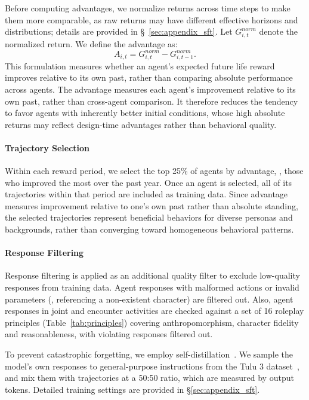 Before computing advantages, we normalize returns across time steps to make them more comparable, as raw returns may have different effective horizons and distributions; details are provided in \S~\ref{sec:appendix_sft}. Let \(G^{norm}_{i,t}\) denote the normalized return. We define the advantage as:
\[
A_{i,t} = G^{norm}_{i,t} - G^{norm}_{i,t-1}.
\]
This formulation measures whether an agent's expected future life reward improves relative to its own past, rather than comparing absolute performance across agents.
The advantage measures each agent's improvement relative to its own past, rather than cross-agent comparison.
It therefore reduces the tendency to favor agents with inherently better initial conditions, whose high absolute returns may reflect design-time advantages rather than behavioral quality.


\paragraph{Trajectory Selection}
Within each reward period, we select the top 25\% of agents by advantage, \ie, those who improved the most over the past year.
Once an agent is selected, all of its trajectories within that period are included as training data.
Since advantage measures improvement relative to one's own past rather than absolute standing, the selected trajectories represent beneficial behaviors for diverse personas and backgrounds, rather than converging toward homogeneous behavioral patterns.

\paragraph{Response Filtering}
Response filtering is applied as an additional quality filter to exclude low-quality responses from training data.
Agent responses with malformed actions or invalid parameters (\eg, referencing a non-existent character) are filtered out.
Also, agent responses in joint and encounter activities are checked against a set of 16 roleplay principles (Table~\ref{tab:principles}) covering anthropomorphism, character fidelity and reasonableness, with violating responses filtered out. %

To prevent catastrophic forgetting, we employ self-distillation~\citep{lu2025onpolicy}.
We sample the model's own responses to general-purpose instructions from the Tulu 3 dataset~\citep{lambert2024tulu}, and mix them with \method trajectories at a 50:50 ratio, which are measured by output tokens.
Detailed training settings are provided in \S\ref{sec:appendix_sft}.
